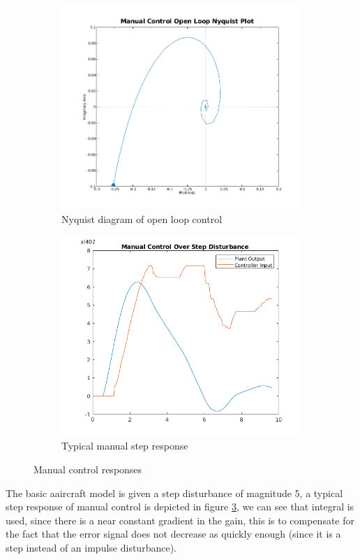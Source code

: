 \documentclass{article}
\begin{document}
\begin{figure}
\centering
\begin{subfigure}{.5\textwidth}
  \centering
  \includegraphics[width=0.8\linewidth]{nyquist_manual.png}
	\caption{Nyquist diagram of open loop control}
	\label{fig:nyquist_manual}
\end{subfigure}%
\begin{subfigure}{.5\textwidth}
  \centering
  \includegraphics[width=0.8\linewidth]{1_3_Plant_Bode_Manual_Control_Step.png}
  \caption{Typical manual step response}
  \label{fig:step_manual}
\end{subfigure}
	\caption{Manual control responses}
\end{figure}

The basic aaircraft model is given a step disturbance of magnitude 5, a typical step response of manual control is depicted in figure \ref{fig:step_manual}, we can see that integral is used, since there is a near constant gradient in the gain, this is to compensate for the fact that the error signal does not decrease as quickly enough (since it is a step instead of an impulse disturbance).
\end{document}
